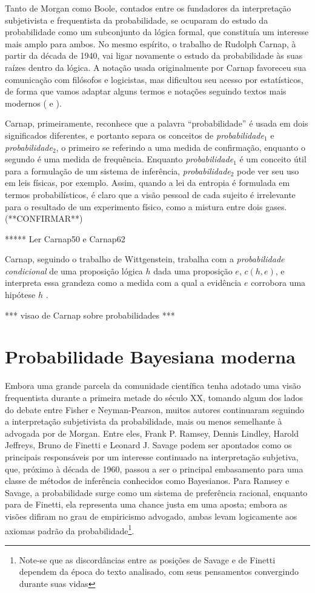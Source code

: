 Tanto de Morgan como Boole, contados entre os fundadores da interpretação subjetivista e frequentista da probabilidade,
se ocuparam do estudo da probabilidade como um subconjunto da lógica formal, que constituía um interesse mais amplo para
ambos. No mesmo espírito, o trabalho de Rudolph Carnap, à partir da década de 1940, vai ligar novamente o estudo da probabilidade
às suas raízes dentro da lógica. A notação usada originalmente por Carnap favoreceu sua comunicação com filósofos e logicistas,
mas dificultou seu acesso por estatísticos, de forma que vamos adaptar alguns termos e notações seguindo textos mais
modernos (\citep{Zabell09} e \citep{Fitelson07}). 

Carnap, primeiramente, reconhece que a palavra ``probabilidade'' é usada em
dois significados diferentes, e portanto separa os conceitos de {\em probabilidade$_1$} e {\em probabilidade$_2$}, o primeiro
se referindo a uma medida de confirmação, enquanto o segundo é uma medida de frequência. Enquanto {\em probabilidade$_1$} é
um conceito útil para a formulação de um sistema de inferência, {\em probabilidade$_2$} pode ver seu uso em leis físicas, por
exemplo. Assim, quando a lei da entropia é formulada em termos probabilísticos, é claro que a visão pessoal de cada sujeito
é irrelevante para o resultado de um experimento físico, como a mistura entre dois gases. (**CONFIRMAR**)

***** Ler Carnap50 e Carnap62

Carnap, seguindo o trabalho de 
Wittgenstein, trabalha com a {\em probabilidade condicional} de uma proposição lógica $h$ dada uma proposição $e$, $c(h, e)$, 
e interpreta essa grandeza como a medida com a qual a evidência $e$ corrobora uma hipótese $h$ \citep{Zabell09}.


*** visao de Carnap sobre probabilidades ***
\section{Probabilidade Bayesiana moderna}\label{sec:bayes}

Embora uma grande parcela da comunidade científica tenha adotado uma visão frequentista durante a primeira metade do século XX,
tomando algum dos lados do debate entre Fisher e Neyman-Pearson, muitos autores continuaram seguindo a interpretação 
subjetivista da probabilidade, mais ou menos semelhante à advogada por de Morgan. Entre eles, Frank P. Ramsey, Dennis Lindley,
Harold Jeffreys, Bruno de Finetti e Leonard J. Savage
podem ser apontados como os principais responsáveis por um interesse continuado na interpretação subjetiva, que, próximo à
década de 1960, passou a ser o principal embasamento para uma classe de métodos de inferência conhecidos como Bayesianos. 
Para Ramsey e Savage, a probabilidade surge como um sistema de preferência racional, enquanto para de Finetti, ela representa
uma chance justa em uma aposta; embora as visões difiram no grau de empiricismo advogado,
ambas levam logicamente aos axiomas padrão da probabilidade\footnote{Note-se que as discordâncias entre as posições de 
Savage e de Finetti	dependem da época do texto analisado, com seus pensamentos convergindo durante suas vidas}.

